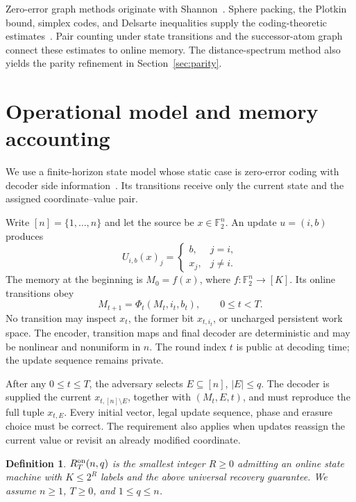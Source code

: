 \documentclass[11pt,a4paper]{article}
\newtheorem{definition}[theorem]{Definition}
\newcommand{\F}{\mathbb F_2}
\begin{document}
Zero-error graph methods originate with Shannon~\cite{shannon1956}. Sphere packing, the Plotkin bound, simplex codes, and Delsarte inequalities supply the coding-theoretic estimates~\cite{hamming1950,plotkin1960,macwilliams1977,delsarte1973}. Pair counting under state transitions and the successor-atom graph connect these estimates to online memory. The distance-spectrum method also yields the parity refinement in Section~\ref{sec:parity}.

\section{Operational model and memory accounting}
We use a finite-horizon state model whose static case is zero-error coding with decoder side information~\cite{witsenhausen1976,orlitsky2001}. Its transitions receive only the current state and the assigned coordinate--value pair.

Write $[n]=\{1,\ldots,n\}$ and let the source be $x\in\F^n$. An update $u=(i,b)$ produces
\[
U_{i,b}(x)_j=\begin{cases}b,&j=i,\\x_j,&j\ne i.\end{cases}
\]
The memory at the beginning is $M_0=f(x)$, where $f:\F^n\to[K]$. Its online transitions obey
\begin{equation}\label{eq:transition}
 M_{t+1}=\Phi_t(M_t,i_t,b_t),\qquad 0\le t<T.
\end{equation}
No transition may inspect $x_t$, the former bit $x_{t,i_t}$, or uncharged persistent work space. The encoder, transition maps and final decoder are deterministic and may be nonlinear and nonuniform in $n$. The round index $t$ is public at decoding time; the update sequence remains private.

After any $0\le t\le T$, the adversary selects $E\subseteq[n]$, $|E|\le q$. The decoder is supplied the current $x_{t,[n]\setminus E}$, together with $(M_t,E,t)$, and must reproduce the full tuple $x_{t,E}$. Every initial vector, legal update sequence, phase and erasure choice must be correct. The requirement also applies when updates reassign the current value or revisit an already modified coordinate.

\begin{definition}\label{def:r}
$R_T^{\rm on}(n,q)$ is the smallest integer $R\ge0$ admitting an online state machine with $K\le 2^R$ labels and the above universal recovery guarantee. We assume $n\ge1$, $T\ge0$, and $1\le q\le n$.
\end{definition}
\end{document}
